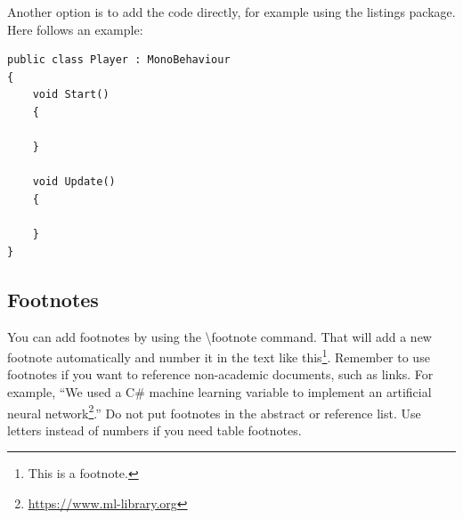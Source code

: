 Another option is to add the code directly, for example using the listings package. Here follows an example:

\begin{lstlisting}[language={[Sharp]C}]
public class Player : MonoBehaviour
{
    void Start()
    {
        
    }

    void Update()
    {
        
    }
}
\end{lstlisting}

\subsection{Footnotes}

You can add footnotes by using the \textbackslash footnote command. That will add a new footnote automatically and number it in the text like this\footnote{This is a footnote.}. Remember to use footnotes if you want to reference non-academic documents, such as links. For example, “We used a C\# machine learning variable to implement an artificial neural network\footnote{\url{https://www.ml-library.org}}.” Do not put footnotes in the abstract or reference list. Use letters instead of numbers if you need table footnotes.
